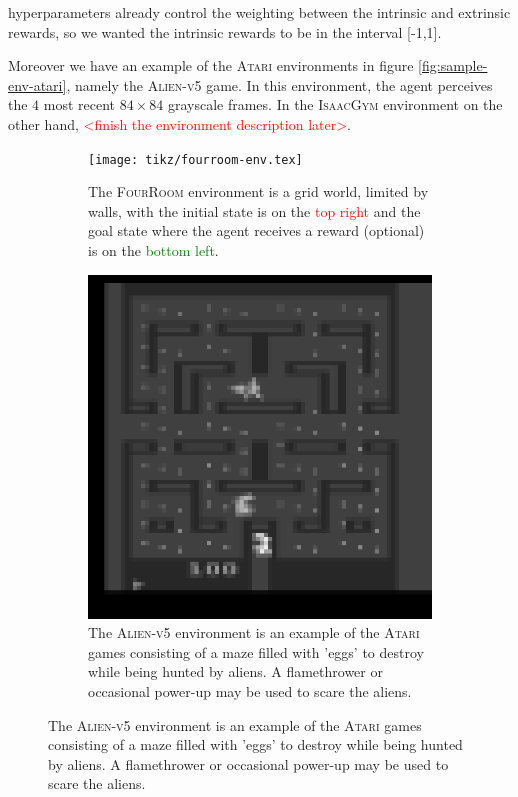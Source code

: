 \documentclass[10pt]{article} %
\begin{document}
hyperparameters already control the weighting between the intrinsic and extrinsic rewards, so we wanted the intrinsic rewards to be in the interval [-1,1].

\noindent Moreover we have an example of the \textsc{Atari} environments in figure \ref{fig:sample-env-atari}, namely the \textsc{Alien-v5} game. In this environment, the agent perceives the $4$ most recent $84\times84$ grayscale frames. In the \textsc{IsaacGym} environment on the other hand, \textcolor{red}{<finish the environment description later>}.

\begin{figure}
  \centering
  \begin{subfigure}[b]{0.32\textwidth}
    \centering
    \texttt{[image: tikz/fourroom-env.tex]}
    \caption{The \textsc{FourRoom} environment is a grid world, limited by walls, with the initial state is on the \textcolor{red}{top right} and the goal state where the agent receives a reward (optional) is on the \textcolor{green}{bottom left}.}
    \label{fig:sample-env-fourroom}
  \end{subfigure}
  \hfill
  \begin{subfigure}[b]{0.32\textwidth}
    \centering
    \includegraphics[width=\textwidth]{figures/atari.png}
    \caption{The \textsc{Alien-v5} environment is an example of the \textsc{Atari} games consisting of a maze filled with 'eggs' to destroy while being hunted by aliens. A flamethrower or occasional power-up may be used to scare the aliens.}

\end{subfigure}
\end{figure}
\end{document}
